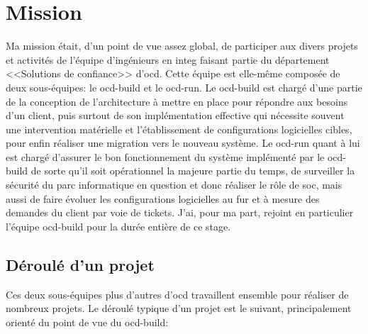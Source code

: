 \documentclass[12pt, oneside, a4paper, titlepage]{report}
\begin{document}
\chapter{Mission}%
\label{cha:mission}

Ma mission était, d'un point de vue assez global, de participer aux divers
projets et activités de l'équipe d'ingénieurs en \gls{integ} faisant partie du
département <<Solutions de confiance>> d'\acrlong{ocd}. Cette équipe est
elle-même composée de deux sous-équipes: le \gls{ocd-build} et le \gls{ocd-run}.
Le \gls{ocd-build} est chargé d'une partie de la conception de l'architecture à
mettre en place pour répondre aux besoins d'un client, puis surtout de son
implémentation effective qui nécessite souvent une intervention matérielle et
l'établissement de configurations logicielles cibles, pour enfin réaliser une
migration vers le nouveau système. Le \gls{ocd-run} quant à lui est chargé
d'assurer le bon fonctionnement du système implémenté par le \gls{ocd-build} de
sorte qu'il soit opérationnel la majeure partie du temps, de surveiller la
sécurité du parc informatique en question et donc réaliser le rôle de \gls{soc},
mais aussi de faire évoluer les configurations logicielles au fur et à mesure
des demandes du client par voie de tickets. J'ai, pour ma part, rejoint en
particulier l'équipe \gls{ocd-build} pour la durée entière de ce stage.


\section{Déroulé d'un projet}%
\label{sec:mission::deroule-projet}

Ces deux sous-équipes plus d'autres d'\gls{ocd} travaillent ensemble pour
réaliser de nombreux projets. Le déroulé typique d'un projet est le suivant,
principalement orienté du point de vue du \gls{ocd-build}:
\end{document}
